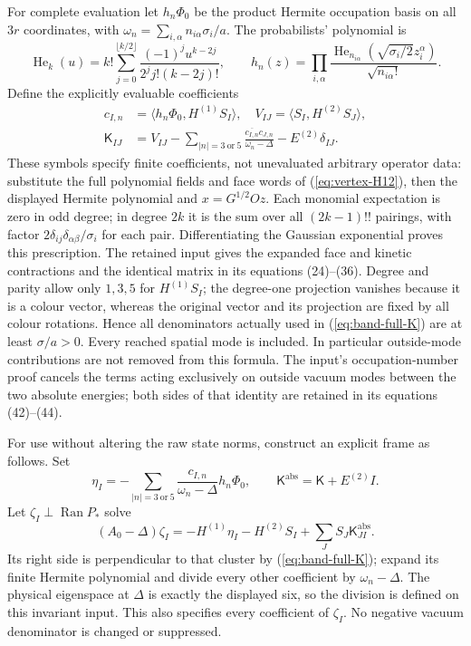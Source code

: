 For complete evaluation let $h_n\Phi_0$ be the product Hermite
occupation basis on all $3r$ coordinates, with
$\omega_n=\sum_{i,\alpha}n_{i\alpha}\sigma_i/a$.
The probabilists' polynomial is
\[
 \operatorname{He}_k(u)=k!\sum_{j=0}^{\lfloor k/2\rfloor}
 \frac{(-1)^j u^{k-2j}}{2^j j!(k-2j)!},\qquad
 h_n(z)=\prod_{i,\alpha}
 \frac{\operatorname{He}_{n_{i\alpha}}(\sqrt{\sigma_i/2}z_i^\alpha)}
      {\sqrt{n_{i\alpha}!}}.
\]
Define the explicitly evaluable coefficients
\begin{align}
 c_{I,n}&=\langle h_n\Phi_0,H^{(1)}S_I\rangle,\quad
 V_{IJ}=\langle S_I,H^{(2)}S_J\rangle,\nonumber\\
 \mathsf K_{IJ}&=V_{IJ}
   -\sum_{|n|=3\ \mathrm{or}\ 5}
                  \frac{\overline{c_{I,n}}c_{J,n}}{\omega_n-\Delta}
   -E^{(2)}\delta_{IJ}.
 \label{eq:band-full-K}
\end{align}
These symbols specify finite coefficients, not unevaluated arbitrary
operator data: substitute the full polynomial fields and face words
of (\ref{eq:vertex-H12}), then the displayed Hermite polynomial and
$x=G^{1/2}Oz$. Each monomial expectation is zero in odd degree;
in degree $2k$ it is the sum over all $(2k-1)!!$ pairings, with
factor $2\delta_{ij}\delta_{\alpha\beta}/\sigma_i$ for each pair.
Differentiating the Gaussian exponential proves this prescription.
The retained input gives the expanded face and kinetic contractions
and the identical matrix in its equations (24)--(36).
Degree and parity allow only $1,3,5$ for $H^{(1)}S_I$;
the degree-one projection vanishes because it is a colour vector,
whereas the original vector and its projection are fixed by all
colour rotations. Hence all denominators actually used in
(\ref{eq:band-full-K}) are at least $\sigma/a>0$. Every reached
spatial mode is included. In particular outside-mode contributions
are not removed from this formula. The input's occupation-number
proof cancels the terms acting exclusively on outside vacuum modes
between the two absolute energies; both sides of that identity are
retained in its equations (42)--(44).

For use without altering the raw state norms, construct an explicit
frame as follows. Set
\[
 \eta_I=-\sum_{|n|=3\ \mathrm{or}\ 5}
              \frac{c_{I,n}}{\omega_n-\Delta}h_n\Phi_0,
 \qquad \mathsf K^{\mathrm{abs}}=\mathsf K+E^{(2)}I.
\]
Let $\zeta_I\perp\operatorname{Ran}P_*$ solve
\begin{equation}\label{eq:band-zeta}
 (A_0-\Delta)\zeta_I
 =-H^{(1)}\eta_I-H^{(2)}S_I+\sum_JS_J\mathsf K^{\mathrm{abs}}_{JI}.
\end{equation}
Its right side is perpendicular to that cluster by
(\ref{eq:band-full-K}); expand its finite Hermite polynomial and
divide every other coefficient by $\omega_n-\Delta$.
The physical eigenspace at $\Delta$ is exactly the displayed six,
so the division is defined on this invariant input. This also
specifies every coefficient of $\zeta_I$. No negative vacuum
denominator is changed or suppressed.

